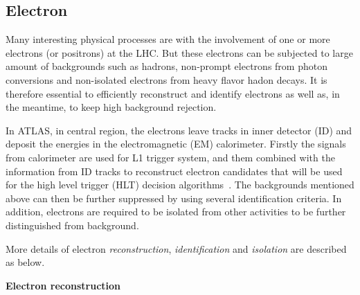 \subsection{Electron}
\label{sec:electron}

Many interesting physical processes are with the involvement of one or more electrons (or positrons) at the LHC.
But these electrons can be subjected to large amount of backgrounds such as hadrons, non-prompt electrons from photon conversions and non-isolated electrons from heavy flavor hadon decays.
It is therefore essential to efficiently reconstruct and identify electrons as well as, in the meantime, to keep high background rejection.

In ATLAS, in central region, the electrons leave tracks in inner detector (ID) and deposit the energies in the electromagnetic (EM) calorimeter. 
Firstly the signals from calorimeter are used for L1 trigger system, and them combined with the information from ID tracks to reconstruct electron candidates that will be used for the high level trigger (HLT) decision algorithms~\cite{ATLAS-CONF-2016-024}.
The backgrounds mentioned above can then be further suppressed by using several identification criteria.
In addition, electrons are required to be isolated from other activities to be further distinguished from background.

More details of electron \textit{reconstruction}, \textit{identification} and \textit{isolation} are described as below.

\textbf{Electron reconstruction} 

